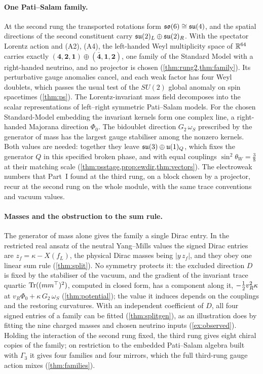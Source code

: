 \paragraph{One Pati--Salam family.} At the second rung the transported rotations form $\mathfrak{so}(6)\cong\mathfrak{su}(4)$, and the spatial directions of the
second constituent carry $\mathfrak{su}(2)_L\oplus\mathfrak{su}(2)_R$. With the spectator Lorentz action and (A2), (A4), the left-handed Weyl multiplicity space of
$\mathbb{R}^{64}$ carries exactly $(\mathbf4,\mathbf2,\mathbf1)\oplus(\bar{\mathbf4},\mathbf1,\mathbf2)$, one family of the Standard Model with a
right-handed neutrino, and no projector is chosen (\cref{thm:rung2,thm:family}). Its perturbative gauge anomalies cancel, and each weak factor
has four Weyl doublets, which passes the usual test of the $SU(2)$ global anomaly on spin spacetimes (\cref{thm:ps}). The Lorentz-invariant
mass field decomposes into the scalar representations of left--right symmetric Pati--Salam models. For the chosen Standard-Model embedding
the invariant kernels form one complex line, a right-handed Majorana direction $\Phi_0$. The bidoublet direction $G_2\,\omega_S$ prescribed by
the generator of mass has the largest gauge stabiliser among the nonzero kernels. Both values are needed: together they leave
$\mathfrak{su}(3)\oplus\mathfrak{u}(1)_Q$, which fixes the generator $Q$ in this specified broken phase, and with equal couplings $\sin^2\theta_W=\tfrac38$ at their
matching scale (\cref{thm:psstage,prop:ewdir,thm:vectors}). The electroweak numbers that Part~I found at the third rung, on a block chosen by a
projector, recur at the second rung on the whole module, with the same trace conventions and vacuum values.

\paragraph{Masses and the obstruction to the sum rule.} The generator of mass alone gives the family a single Dirac entry. In the restricted
real ansatz of the neutral Yang--Mills values the signed Dirac entries are $z_f=\kappa-X(f_L)$, the physical Dirac masses being $|y\,z_f|$,
and they obey one linear sum rule (\cref{thm:split}). No symmetry protects it: the excluded direction $D$ is fixed by the stabiliser of the
vacuum, and the gradient of the invariant trace quartic $\operatorname{Tr}((mm^\top)^2)$, computed in closed form, has a component along it,
$-\tfrac12 v_R^2\kappa$ at $v_R\Phi_0+\kappa\,G_2\,\omega_S$ (\cref{thm:potential}); the value it induces depends on the couplings and the
restoring curvatures. With an independent coefficient of $D$, all four signed entries of a family can be fitted (\cref{thm:splitgen}), as an
illustration does by fitting the nine charged masses and chosen neutrino inputs (\cref{ex:observed}). Holding the interaction of the second rung fixed, the third rung gives eight
chiral copies of the family; on restriction to the embedded Pati--Salam algebra built with $\Gamma_3$ it gives four families and four
mirrors, which the full third-rung gauge action mixes (\cref{thm:families}).


